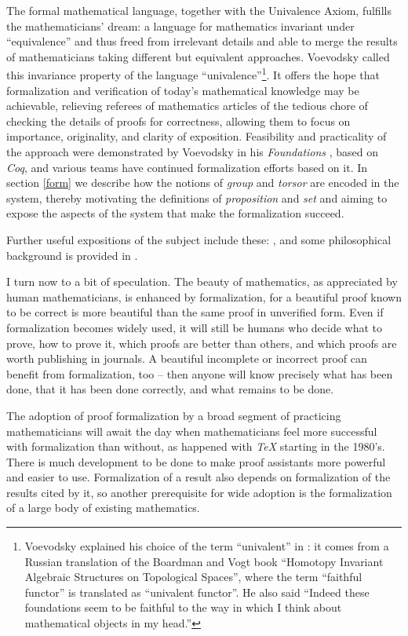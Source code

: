 \documentclass[letter,12pt]{amsart}
\theoremstyle{definition}
\theoremstyle{remark}
\numberwithin{equation}{section}
\begin{document}
The formal mathematical language, together with the Univalence Axiom, fulfills the mathematicians' dream: a language for mathematics invariant under
``equivalence'' and thus freed from irrelevant details and able to merge the results of mathematicians taking different but equivalent
approaches.  Voevodsky called this invariance property of the language ``univalence''\footnote{Voevodsky explained his choice of the term
  ``univalent'' in \citep{VV-IHP-talk}: it comes from a Russian translation of the Boardman and Vogt book ``Homotopy Invariant Algebraic
  Structures on Topological Spaces'', where the term ``faithful functor'' is translated as ``univalent functor''.  He also said ``Indeed these
  foundations seem to be faithful to the way in which I think about mathematical objects in my head.''}.
It offers the hope that formalization and verification
of today's mathematical knowledge may be achievable, relieving referees of mathematics articles of the tedious chore of checking the details of
proofs for correctness, allowing them to focus on importance, originality, and clarity of exposition.  Feasibility and practicality of the
approach were demonstrated by Voevodsky in his {\em Foundations} \citep{Foundations,UniMath2015}, based on {\em Coq}, and various teams have continued
formalization efforts based on it.  In section \ref{form} we describe how the notions of {\em group} and {\em torsor} are encoded in the system,
thereby motivating the definitions of {\em proposition} and {\em set} and aiming to expose the aspects of the system that make the formalization
succeed.

Further useful expositions of the subject include these: \citep{MR3363596,hottbook,Swansea-Shulman}, and some philosophical background is provided in
\citep{Tsem1,Tsem2,Tsem3,Tsem4}.

I turn now to a bit of speculation.  The beauty of mathematics, as appreciated by human mathematicians, is enhanced by formalization, for a
beautiful proof known to be correct is more beautiful than the same proof in unverified form.  Even if formalization becomes widely used, it
will still be humans who decide what to prove, how to prove it, which proofs are better than others, and which proofs are worth publishing in
journals.  A beautiful incomplete or incorrect proof can benefit from formalization, too -- then anyone will know precisely what has been done,
that it has been done correctly, and what remains to be done.

The adoption of proof formalization by a broad segment of practicing mathematicians will await the day when mathematicians feel more successful
with formalization than without, as happened with {\em TeX} starting in the 1980's.  There is much development to be done to make proof
assistants more powerful and easier to use.  Formalization of a result also depends on formalization of the results cited by it, so another
prerequisite for wide adoption is the formalization of a large body of existing mathematics.
\end{document}
